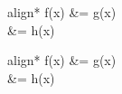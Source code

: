 \documentclass{beamer}
\newcommand{\boxedeq}[1]{\begin{empheq}[box={\fboxsep=6pt\fbox}]{align*}#1\end{empheq}}
\newcommand{\coloredeq}[1]{\begin{empheq}[box=\colorbox{red}]{align*}#1\end{empheq}}
\begin{document}
\begin{frame}
\boxedeq{%
    f(x) &= g(x) \\
    &= h(x)
}
\coloredeq{%
    f(x) &= g(x) \\
    &= h(x)
}
\end{frame}
\end{document}
